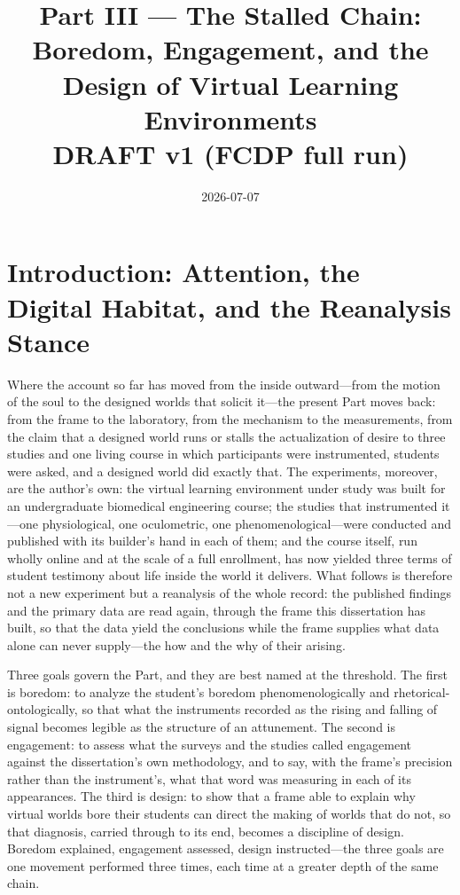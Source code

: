 \documentclass{article}
\title{Part III --- The Stalled Chain: Boredom, Engagement, and the Design of Virtual Learning Environments \\ \large DRAFT v1 (FCDP full run)}
\author{}
\date{2026-07-07}
\begin{document}
\maketitle

\section{Introduction: Attention, the Digital Habitat, and the Reanalysis Stance}

Where the account so far has moved from the inside outward---from the motion of the soul to the designed worlds that solicit it---the present Part moves back: from the frame to the laboratory, from the mechanism to the measurements, from the claim that a designed world runs or stalls the actualization of desire to three studies and one living course in which participants were instrumented, students were asked, and a designed world did exactly that. The experiments, moreover, are the author's own: the virtual learning environment under study was built for an undergraduate biomedical engineering course; the studies that instrumented it---one physiological, one oculometric, one phenomenological---were conducted and published with its builder's hand in each of them; and the course itself, run wholly online and at the scale of a full enrollment, has now yielded three terms of student testimony about life inside the world it delivers. What follows is therefore not a new experiment but a reanalysis of the whole record: the published findings and the primary data are read again, through the frame this dissertation has built, so that the data yield the conclusions while the frame supplies what data alone can never supply---the how and the why of their arising.

Three goals govern the Part, and they are best named at the threshold. The first is boredom: to analyze the student's boredom phenomenologically and rhetorical-ontologically, so that what the instruments recorded as the rising and falling of signal becomes legible as the structure of an attunement. The second is engagement: to assess what the surveys and the studies called engagement against the dissertation's own methodology, and to say, with the frame's precision rather than the instrument's, what that word was measuring in each of its appearances. The third is design: to show that a frame able to explain why virtual worlds bore their students can direct the making of worlds that do not, so that diagnosis, carried through to its end, becomes a discipline of design. Boredom explained, engagement assessed, design instructed---the three goals are one movement performed three times, each time at a greater depth of the same chain.
\end{document}
